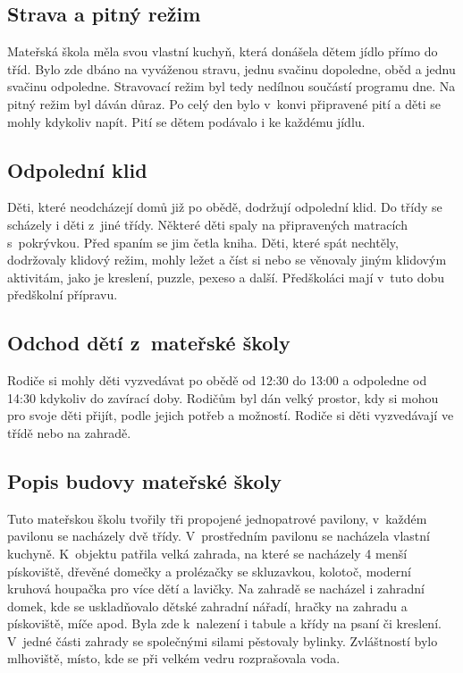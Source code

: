 		\subsection{Strava a pitný režim}
			Mateřská škola měla svou vlastní kuchyň, která donášela dětem jídlo přímo do tříd. Bylo zde dbáno na vyváženou stravu, jednu svačinu dopoledne, oběd a jednu svačinu odpoledne. Stravovací režim byl tedy nedílnou součástí programu dne. Na pitný režim byl dáván důraz. Po celý den bylo v~konvi připravené pití a děti se mohly kdykoliv napít. Pití se dětem podávalo i ke každému jídlu.

		\subsection{Odpolední klid}
			Děti, které neodcházejí domů již po obědě, dodržují odpolední klid. Do třídy se scházely i děti z~jiné třídy. Některé děti spaly na připravených matracích s~pokrývkou. Před spaním se jim četla kniha. Děti, které spát nechtěly, dodržovaly klidový režim, mohly ležet a číst si nebo se věnovaly jiným klidovým aktivitám, jako je kreslení, puzzle, pexeso a další. Předškoláci mají v tuto dobu předškolní přípravu. 


		\subsection{Odchod dětí z~mateřské školy}
			Rodiče si mohly děti vyzvedávat po obědě od 12:30 do 13:00 a odpoledne od 14:30 kdykoliv do zavírací doby. Rodičům byl dán velký prostor, kdy si mohou pro svoje děti přijít, podle jejich potřeb a možností. Rodiče si děti vyzvedávají ve třídě nebo na zahradě. 

		\subsection{Popis budovy mateřské školy}

			Tuto mateřskou školu tvořily tři propojené jednopatrové pavilony, v~každém pavilonu se nacházely dvě třídy. V~prostředním pavilonu se nacházela vlastní kuchyně. K~objektu patřila velká zahrada, na které se nacházely 4 menší pískoviště, dřevěné domečky a prolézačky se skluzavkou, kolotoč, moderní kruhová houpačka pro více dětí a lavičky. Na zahradě se nacházel i zahradní domek, kde se uskladňovalo dětské zahradní nářadí, hračky na zahradu a pískoviště, míče apod. Byla zde k~nalezení i tabule a křídy na psaní či kreslení. V~jedné části zahrady se společnými silami pěstovaly bylinky. Zvláštností bylo mlhoviště, místo, kde se při velkém vedru rozprašovala voda. 

